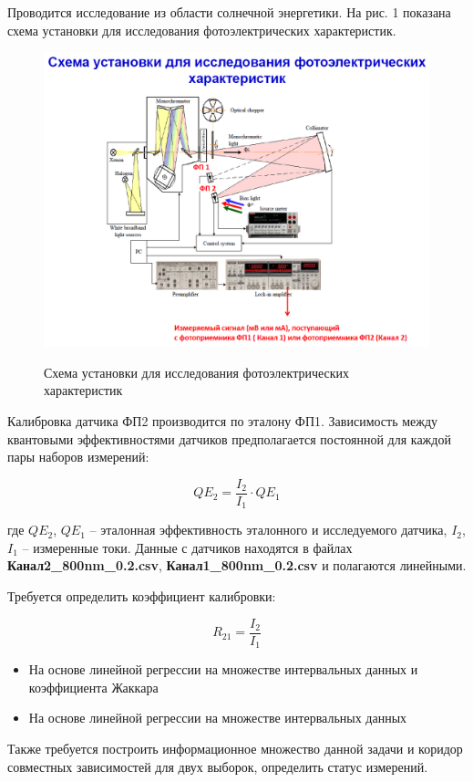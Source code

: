 Проводится исследование из области солнечной энергетики. На рис. 1 показана схема установки для исследования фотоэлектрических характеристик.

\begin{figure}[H]
	\begin{center}
		\includegraphics[scale=0.8]{problem1}
		\label{pic:problem1}
		\caption{Схема установки для исследования фотоэлектрических характеристик}
	\end{center}
\end{figure}

Калибровка датчика ФП2 производится по эталону ФП1. Зависимость между квантовыми эффективностями датчиков предполагается постоянной для каждой пары наборов измерений:

\begin{equation}
	QE_2 = \frac{I_2}{I_1} \cdot QE_1
\end{equation}

где $QE_2$, $QE_1$ -- эталонная эффективность эталонного и исследуемого датчика, $I_2$, $I_1$ -- измеренные токи. Данные с датчиков находятся в файлах \textbf{Канал2\_800nm\_0.2.csv}, \textbf{Канал1\_800nm\_0.2.csv} и полагаются линейными.

Требуется определить коэффициент калибровки:

\begin{equation}
R_{21} = \frac{I_2}{I_1}
\end{equation}

\begin{itemize}
	\item На основе линейной регрессии на множестве интервальных данных и коэффициента Жаккара
	\item На основе линейной регрессии на множестве интервальных данных
\end{itemize}

Также требуется построить информационное множество данной задачи и коридор совместных зависимостей для двух выборок, определить статус измерений.
